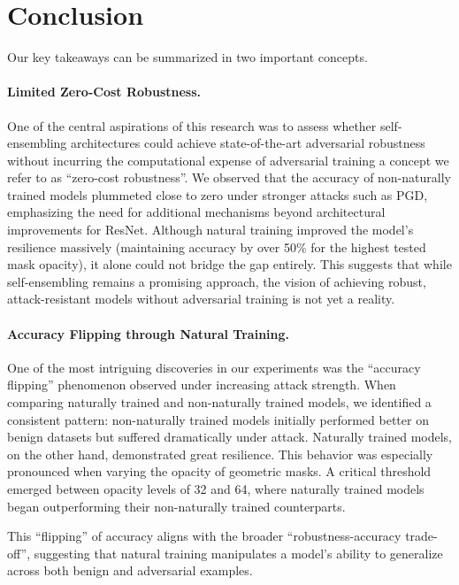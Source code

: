 \documentclass[a4paper, oneside]{discothesis}
\begin{document}
\section{Conclusion}

Our key takeaways can be summarized in two important concepts.

\paragraph{Limited Zero-Cost Robustness.}

One of the central aspirations of this research was to assess whether self-ensembling architectures could achieve state-of-the-art adversarial robustness without incurring the computational expense of adversarial training \textendash{} a concept we refer to as ``zero-cost robustness''. We observed that the accuracy of non-naturally trained models plummeted close to zero under stronger attacks such as PGD, emphasizing the need for additional mechanisms beyond architectural improvements for ResNet. Although natural training improved the model's resilience massively (maintaining accuracy by over 50\% for the highest tested mask opacity), it alone could not bridge the gap entirely. This suggests that while self-ensembling remains a promising approach, the vision of achieving robust, attack-resistant models without adversarial training is not yet a reality.

\paragraph{Accuracy Flipping through Natural Training.}

One of the most intriguing discoveries in our experiments was the ``accuracy flipping'' phenomenon observed under increasing attack strength. When comparing naturally trained and non-naturally trained models, we identified a consistent pattern: non-naturally trained models initially performed better on benign datasets but suffered dramatically under attack. Naturally trained models, on the other hand, demonstrated great resilience. This behavior was especially pronounced when varying the opacity of geometric masks. A critical threshold emerged between opacity levels of 32 and 64, where naturally trained models began outperforming their non-naturally trained counterparts.

This ``flipping'' of accuracy aligns with the broader ``robustness-accuracy trade-off'', suggesting that natural training manipulates a model's ability to generalize across both benign and adversarial examples.
\end{document}

